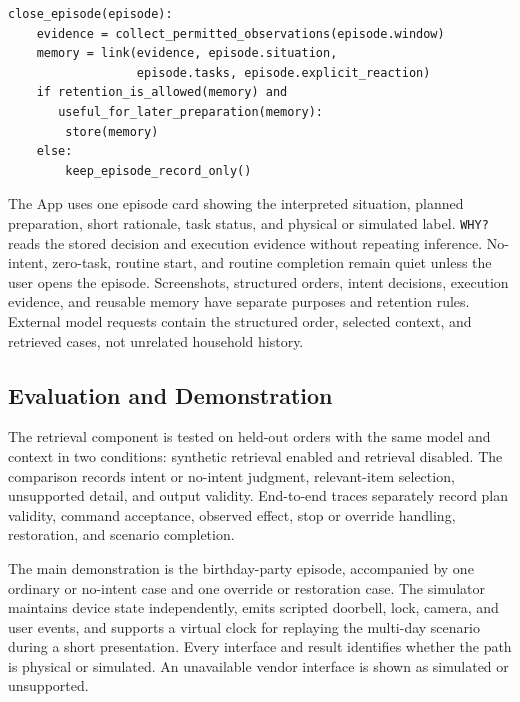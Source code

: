 \documentclass[conference]{IEEEtran}
\begin{document}
\noindent\begin{minipage}{\columnwidth}
\begin{lstlisting}
close_episode(episode):
    evidence = collect_permitted_observations(episode.window)
    memory = link(evidence, episode.situation,
                  episode.tasks, episode.explicit_reaction)
    if retention_is_allowed(memory) and
       useful_for_later_preparation(memory):
        store(memory)
    else:
        keep_episode_record_only()
\end{lstlisting}
\end{minipage}
The App uses one episode card showing the interpreted situation, planned preparation, short rationale, task status, and physical or simulated label. \texttt{WHY?} reads the stored decision and execution evidence without repeating inference. No-intent, zero-task, routine start, and routine completion remain quiet unless the user opens the episode. Screenshots, structured orders, intent decisions, execution evidence, and reusable memory have separate purposes and retention rules. External model requests contain the structured order, selected context, and retrieved cases, not unrelated household history.

\subsection{Evaluation and Demonstration}
The retrieval component is tested on held-out orders with the same model and context in two conditions: synthetic retrieval enabled and retrieval disabled. The comparison records intent or no-intent judgment, relevant-item selection, unsupported detail, and output validity. End-to-end traces separately record plan validity, command acceptance, observed effect, stop or override handling, restoration, and scenario completion.

The main demonstration is the birthday-party episode, accompanied by one ordinary or no-intent case and one override or restoration case. The simulator maintains device state independently, emits scripted doorbell, lock, camera, and user events, and supports a virtual clock for replaying the multi-day scenario during a short presentation. Every interface and result identifies whether the path is physical or simulated. An unavailable vendor interface is shown as simulated or unsupported.
\end{document}
